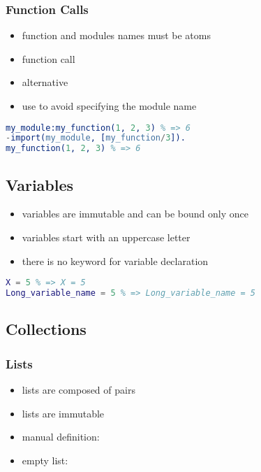 \documentclass[a4paper,landscape,10pt]{article}
\begin{document}
\begin{multicols*}{2}
  \breakcolumn

  \subsubsection{Function Calls}

  \begin{itemize}
    \item function and modules names must be atoms
    \item function call 
    \item alternative 
    \item use  to avoid specifying the module name
  \end{itemize}

  \begin{lstlisting}[language=Erlang]
my_module:my_function(1, 2, 3) % => 6
-import(my_module, [my_function/3]).
my_function(1, 2, 3) % => 6
\end{lstlisting}

  \subsection{Variables}

  \begin{itemize}
    \item variables are immutable and can be bound only once
    \item variables start with an uppercase letter
    \item there is no keyword for variable declaration
  \end{itemize}

  \begin{lstlisting}[language=Erlang]
X = 5 % => X = 5
Long_variable_name = 5 % => Long_variable_name = 5
  \end{lstlisting}

  \subsection{Collections}

  \subsubsection{Lists}

  \begin{itemize}
    \item lists are composed of pairs
    \item lists are immutable
    \item manual definition: \ierlang{[1, 2, 3]}
    \item empty list: \ierlang{[]}
  \end{itemize}


\end{multicols*}
\end{document}
